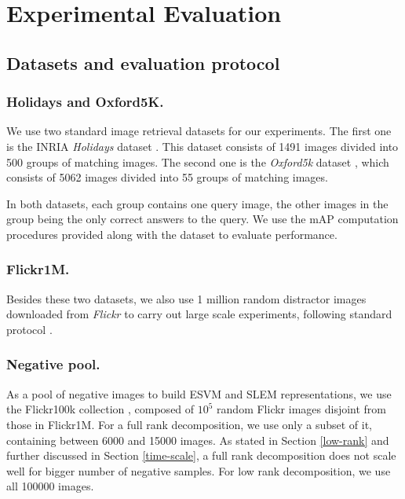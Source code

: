 \section{Experimental Evaluation}
\label{eval}


\subsection{Datasets and evaluation protocol} \label{eval:protocol}
\subsubsection{Holidays and Oxford5K.} We use two standard image retrieval datasets for our experiments. The first one is the INRIA \emph{Holidays} dataset \cite{holidays}. This dataset consists of 1491 images divided into 500 groups of matching images. %
The second one is  the \emph{Oxford5k} dataset \cite{oxford}, which consists of 5062 images divided into 55 groups of matching images. 

In both datasets, each group contains one query image, the other images in the group being the only correct answers to the query. We use the mAP computation procedures provided along with the dataset to evaluate performance.

\subsubsection{Flickr1M.} Besides these two datasets, we also use 1 million random distractor images downloaded from \emph{Flickr} to carry out large scale experiments, following standard protocol \cite{holidays,Delhumeau2013,ZePe15}.

\subsubsection{Negative pool.} As a pool of negative images to build ESVM and SLEM representations, we use the Flickr100k collection \cite{oxford}, composed of $10^5$ random Flickr images disjoint from those in Flickr1M. For a full rank decomposition, we use only a subset of it, containing between 6000 and 15000 images.
As stated in Section \ref{low-rank} and further discussed in Section \ref{time-scale}, a full rank decomposition does not scale well for bigger number of negative samples. For low rank decomposition, we use all 100000 images.

